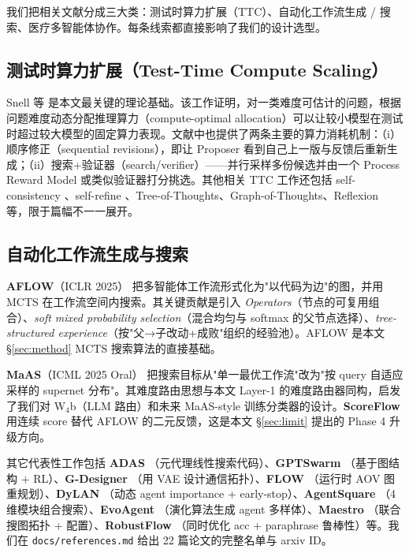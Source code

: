 \documentclass[11pt,a4paper]{ctexart}
\begin{document}
我们把相关文献分成三大类：测试时算力扩展（TTC）、自动化工作流生成 / 搜索、医疗多智能体协作。每条线索都直接影响了我们的设计选型。

\subsection{测试时算力扩展（Test-Time Compute Scaling）}

Snell 等 \cite{snell2024scaling} 是本文最关键的理论基础。该工作证明，对一类难度可估计的问题，根据问题难度动态分配推理算力（compute-optimal allocation）可以让较小模型在测试时超过较大模型的固定算力表现。文献中也提供了两条主要的算力消耗机制：（i）顺序修正（sequential revisions），即让 Proposer 看到自己上一版与反馈后重新生成；（ii）搜索+验证器（search/verifier）——并行采样多份候选并由一个 Process Reward Model 或类似验证器打分挑选。其他相关 TTC 工作还包括 self-consistency \cite{wang2022scconsist}、self-refine \cite{madaan2023selfrefine}、Tree-of-Thoughts、Graph-of-Thoughts、Reflexion 等，限于篇幅不一一展开。

\subsection{自动化工作流生成与搜索}

\textbf{AFLOW}（ICLR 2025）\cite{aflow2024} 把多智能体工作流形式化为"以代码为边"的图，并用 MCTS 在工作流空间内搜索。其关键贡献是引入 \emph{Operators}（节点的可复用组合）、\emph{soft mixed probability selection}（混合均匀与 softmax 的父节点选择）、\emph{tree-structured experience}（按"父→子改动+成败"组织的经验池）。AFLOW 是本文 \S\ref{sec:method} MCTS 搜索算法的直接基础。

\textbf{MaAS}（ICML 2025 Oral）\cite{maas2025} 把搜索目标从"单一最优工作流"改为"按 query 自适应采样的 supernet 分布"。其难度路由思想与本文 Layer-1 的难度路由器同构，启发了我们对 W$_4$b（LLM 路由）和未来 MaAS-style 训练分类器的设计。\textbf{ScoreFlow} \cite{scoreflow2025} 用连续 score 替代 AFLOW 的二元反馈，这是本文 \S\ref{sec:limit} 提出的 Phase 4 升级方向。

其它代表性工作包括 \textbf{ADAS} \cite{adas2024}（元代理线性搜索代码）、\textbf{GPTSwarm} \cite{gptswarm2024}（基于图结构 + RL）、\textbf{G-Designer} \cite{gdesigner2025}（用 VAE 设计通信拓扑）、\textbf{FLOW} \cite{flow2025}（运行时 AOV 图重规划）、\textbf{DyLAN} \cite{dylan2024}（动态 agent importance + early-stop）、\textbf{AgentSquare} \cite{agentsquare2025}（4 维模块组合搜索）、\textbf{EvoAgent} \cite{evoagent2024}（演化算法生成 agent 多样体）、\textbf{Maestro} \cite{maestro2025}（联合搜图拓扑 + 配置）、\textbf{RobustFlow} \cite{robustflow2025}（同时优化 acc + paraphrase 鲁棒性）等。我们在 \texttt{docs/references.md} 给出 22 篇论文的完整名单与 arxiv ID。
\end{document}
